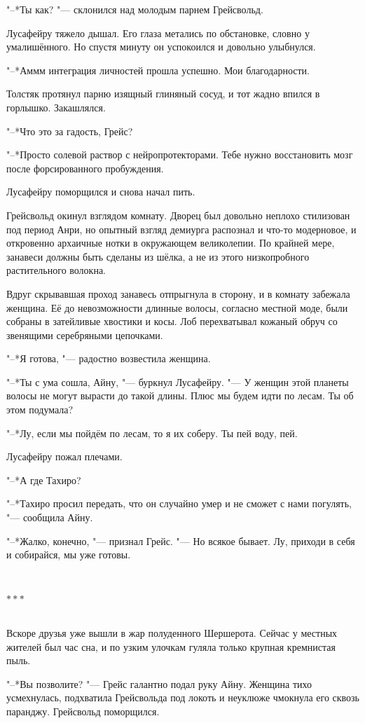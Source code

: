 \documentclass[a4paper,10pt,fleqn]{book}
\newcommand{\ldotst}{\so{...}\xspace}
\newcommand{\razd}{~\\{\centering\Large\bfseries$\ast \ast \ast$\par}~\\}
\begin{document}
"--*Ты как? "--- склонился над молодым парнем Грейсвольд.

Лусафейру тяжело дышал.
Его глаза метались по обстановке, словно у умалишённого. Но спустя минуту он успокоился и довольно улыбнулся.

"--*Аммм\ldotst интеграция личностей прошла успешно.
Мои благодарности.

Толстяк протянул парню изящный глиняный сосуд, и тот жадно впился в горлышко.
Закашлялся.

"--*Что это за гадость, Грейс?

"--*Просто солевой раствор с нейропротекторами.
Тебе нужно восстановить мозг после форсированного пробуждения.

Лусафейру поморщился и снова начал пить.

Грейсвольд окинул взглядом комнату.
Дворец был довольно неплохо стилизован под период Анри, но опытный взгляд демиурга распознал и что-то модерновое, и откровенно архаичные нотки в окружающем великолепии.
По крайней мере, занавеси должны быть сделаны из шёлка, а не из этого низкопробного растительного волокна.

Вдруг скрывавшая проход занавесь отпрыгнула в сторону, и в комнату забежала женщина.
Её до невозможности длинные волосы, согласно местной моде, были собраны в затейливые хвостики и косы.
Лоб перехватывал кожаный обруч со звенящими серебряными цепочками.

"--*Я готова, "--- радостно возвестила женщина.

"--*Ты с ума сошла, Айну, "--- буркнул Лусафейру.
"--- У женщин этой планеты волосы не могут вырасти до такой длины.
Плюс мы будем идти по лесам.
Ты об этом подумала?

"--*Лу, если мы пойдём по лесам, то я их соберу.
Ты пей воду, пей.

Лусафейру пожал плечами.

"--*А где Тахиро?

"--*Тахиро просил передать, что он случайно умер и не сможет с нами погулять, "--- сообщила Айну.

"--*Жалко, конечно, "--- признал Грейс.
"--- Но всякое бывает.
Лу, приходи в себя и собирайся, мы уже готовы.

\razd

Вскоре друзья уже вышли в жар полуденного Шершерота.
Сейчас у местных жителей был час сна, и по узким улочкам гуляла только крупная кремнистая пыль.

"--*Вы позволите? "--- Грейс галантно подал руку Айну.
Женщина тихо усмехнулась, подхватила Грейсвольда под локоть и неуклюже чмокнула его сквозь паранджу.
Грейсвольд поморщился.
\end{document}
